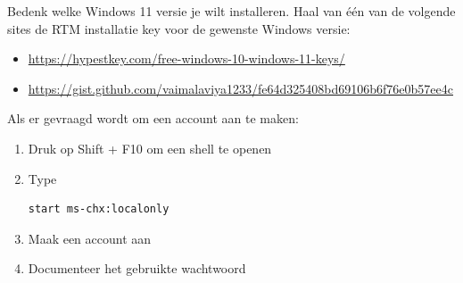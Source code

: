 Bedenk welke Windows 11 versie je wilt installeren. Haal van \'e\'en van de volgende sites de RTM installatie key voor de gewenste Windows versie:
\begin{itemize}
\item \url{https://hypestkey.com/free-windows-10-windows-11-keys/}
\item \url{https://gist.github.com/vaimalaviya1233/fe64d325408bd69106b6f76e0b57ee4c}
\end{itemize}

Als er gevraagd wordt om een account aan te maken:
\begin{enumerate}
\item Druk op Shift + F10 om een shell te openen
\item Type
\begin{lstlisting}[language=bash]
start ms-chx:localonly
\end{lstlisting}
\item Maak een account aan
\item Documenteer het gebruikte wachtwoord
\end{enumerate}

